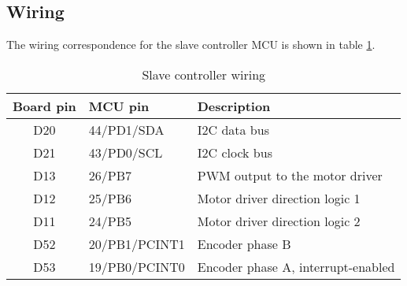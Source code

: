 \subsection{Wiring}
The wiring correspondence for the slave controller MCU is shown in table
\ref{tab:slave-wiring}.
\begin{table}[htb]
  \begin{tabularx}{\textwidth}{c l X}
    \toprule
    Board pin & MCU pin & Description \\
    \midrule
    D20 & 44/PD1/SDA    & I2C data bus \\
    D21 & 43/PD0/SCL    & I2C clock bus \\
    D13 & 26/PB7        & PWM output to the motor driver \\
    D12 & 25/PB6        & Motor driver direction logic 1 \\
    D11 & 24/PB5        & Motor driver direction logic 2 \\
    D52 & 20/PB1/PCINT1 & Encoder phase B \\
    D53 & 19/PB0/PCINT0 & Encoder phase A, interrupt-enabled \\
    \bottomrule
  \end{tabularx}
  \caption{Slave controller wiring}
  \label{tab:slave-wiring}
\end{table}
